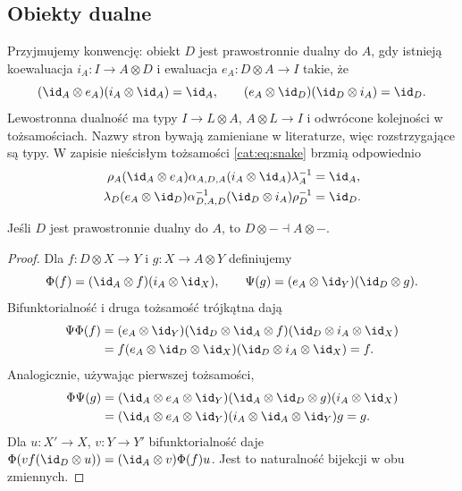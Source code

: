 \subsection{Obiekty dualne}
\begin{definicja}[Dualność]\label{cat:def:dual-object}
Przyjmujemy konwencję: obiekt $D$ jest prawostronnie dualny do $A$, gdy istnieją koewaluacja $i_A:I\to A\otimes D$ i ewaluacja $e_A:D\otimes A\to I$ takie, że
\begin{equation}\label{cat:eq:snake}
(\id_A\otimes e_A)(i_A\otimes\id_A)=\id_A,\qquad
(e_A\otimes\id_D)(\id_D\otimes i_A)=\id_D.
\end{equation}
Lewostronna dualność ma typy $I\to L\otimes A$, $A\otimes L\to I$ i odwrócone kolejności w tożsamościach. Nazwy stron bywają zamieniane w literaturze, więc rozstrzygające są typy.
W zapisie nieścisłym tożsamości \eqref{cat:eq:snake} brzmią odpowiednio
\[
\begin{aligned}
\rho_A(\id_A\otimes e_A)\alpha_{A,D,A}(i_A\otimes\id_A)\lambda_A^{-1}&=\id_A,\\
\lambda_D(e_A\otimes\id_D)\alpha_{D,A,D}^{-1}(\id_D\otimes i_A)\rho_D^{-1}&=\id_D.
\end{aligned}
\]
\end{definicja}
\begin{twierdzenie}\label{cat:thm:dual-adjunction}
Jeśli $D$ jest prawostronnie dualny do $A$, to $D\otimes-\dashv A\otimes-$.
\end{twierdzenie}
\begin{proof}
Dla $f:D\otimes X\to Y$ i $g:X\to A\otimes Y$ definiujemy
\[
\Phi(f)=(\id_A\otimes f)(i_A\otimes\id_X),\qquad
\Psi(g)=(e_A\otimes\id_Y)(\id_D\otimes g).
\]
Bifunktorialność i druga tożsamość trójkątna dają
\[
\begin{aligned}
\Psi\Phi(f)
&=(e_A\otimes\id_Y)(\id_D\otimes\id_A\otimes f)(\id_D\otimes i_A\otimes\id_X)\\
&=f(e_A\otimes\id_D\otimes\id_X)(\id_D\otimes i_A\otimes\id_X)=f.
\end{aligned}
\]
Analogicznie, używając pierwszej tożsamości,
\[
\begin{aligned}
\Phi\Psi(g)
&=(\id_A\otimes e_A\otimes\id_Y)(\id_A\otimes\id_D\otimes g)(i_A\otimes\id_X)\\
&=(\id_A\otimes e_A\otimes\id_Y)(i_A\otimes\id_A\otimes\id_Y)g=g.
\end{aligned}
\]
Dla $u:X'\to X$, $v:Y\to Y'$ bifunktorialność daje
$\Phi(vf(\id_D\otimes u))=(\id_A\otimes v)\Phi(f)u$.
Jest to naturalność bijekcji w obu zmiennych.
\end{proof}
